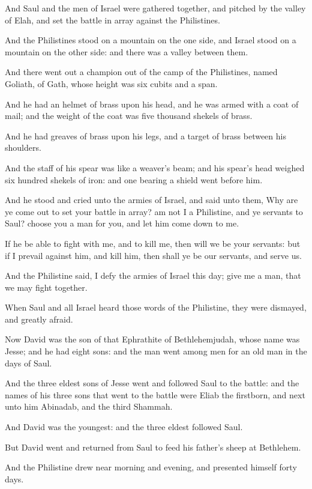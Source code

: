 \verse And Saul and the men of Israel were gathered together, and pitched by the valley of Elah, and set the battle in array against the Philistines.

\verse And the Philistines stood on a mountain on the one side, and Israel stood on a mountain on the other side: and there was a valley between them.

\verse And there went out a champion out of the camp of the Philistines, named Goliath, of Gath, whose height was six cubits and a span.

\verse And he had an helmet of brass upon his head, and he was armed with a coat of mail; and the weight of the coat was five thousand shekels of brass.

\verse And he had greaves of brass upon his legs, and a target of brass between his shoulders.

\verse And the staff of his spear was like a weaver's beam; and his spear's head weighed six hundred shekels of iron: and one bearing a shield went before him.

\verse And he stood and cried unto the armies of Israel, and said unto them, Why are ye come out to set your battle in array? am not I a Philistine, and ye servants to Saul? choose you a man for you, and let him come down to me.

\verse If he be able to fight with me, and to kill me, then will we be your servants: but if I prevail against him, and kill him, then shall ye be our servants, and serve us.

\verse And the Philistine said, I defy the armies of Israel this day; give me a man, that we may fight together.

\verse When Saul and all Israel heard those words of the Philistine, they were dismayed, and greatly afraid.

\verse Now David was the son of that Ephrathite of Bethlehemjudah, whose name was Jesse; and he had eight sons: and the man went among men for an old man in the days of Saul.

\verse And the three eldest sons of Jesse went and followed Saul to the battle: and the names of his three sons that went to the battle were Eliab the firstborn, and next unto him Abinadab, and the third Shammah.

\verse And David was the youngest: and the three eldest followed Saul.

\verse But David went and returned from Saul to feed his father's sheep at Bethlehem.

\verse And the Philistine drew near morning and evening, and presented himself forty days.

